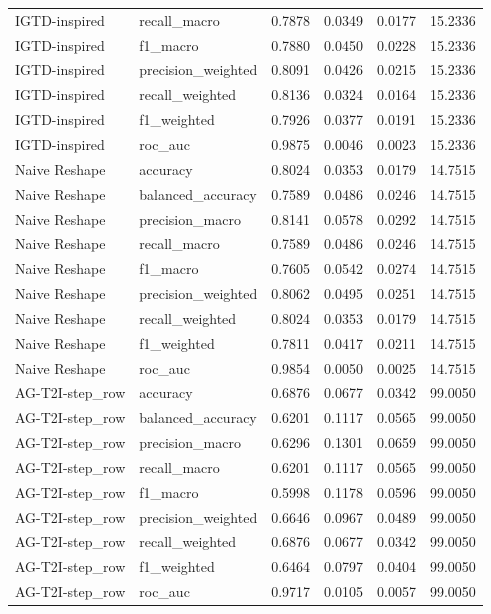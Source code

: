 \begin{tabular}{llrrrr}
IGTD-inspired & recall_macro & 0.7878 & 0.0349 & 0.0177 & 15.2336 \\
IGTD-inspired & f1_macro & 0.7880 & 0.0450 & 0.0228 & 15.2336 \\
IGTD-inspired & precision_weighted & 0.8091 & 0.0426 & 0.0215 & 15.2336 \\
IGTD-inspired & recall_weighted & 0.8136 & 0.0324 & 0.0164 & 15.2336 \\
IGTD-inspired & f1_weighted & 0.7926 & 0.0377 & 0.0191 & 15.2336 \\
IGTD-inspired & roc_auc & 0.9875 & 0.0046 & 0.0023 & 15.2336 \\
Naive Reshape & accuracy & 0.8024 & 0.0353 & 0.0179 & 14.7515 \\
Naive Reshape & balanced_accuracy & 0.7589 & 0.0486 & 0.0246 & 14.7515 \\
Naive Reshape & precision_macro & 0.8141 & 0.0578 & 0.0292 & 14.7515 \\
Naive Reshape & recall_macro & 0.7589 & 0.0486 & 0.0246 & 14.7515 \\
Naive Reshape & f1_macro & 0.7605 & 0.0542 & 0.0274 & 14.7515 \\
Naive Reshape & precision_weighted & 0.8062 & 0.0495 & 0.0251 & 14.7515 \\
Naive Reshape & recall_weighted & 0.8024 & 0.0353 & 0.0179 & 14.7515 \\
Naive Reshape & f1_weighted & 0.7811 & 0.0417 & 0.0211 & 14.7515 \\
Naive Reshape & roc_auc & 0.9854 & 0.0050 & 0.0025 & 14.7515 \\
AG-T2I-step_row & accuracy & 0.6876 & 0.0677 & 0.0342 & 99.0050 \\
AG-T2I-step_row & balanced_accuracy & 0.6201 & 0.1117 & 0.0565 & 99.0050 \\
AG-T2I-step_row & precision_macro & 0.6296 & 0.1301 & 0.0659 & 99.0050 \\
AG-T2I-step_row & recall_macro & 0.6201 & 0.1117 & 0.0565 & 99.0050 \\
AG-T2I-step_row & f1_macro & 0.5998 & 0.1178 & 0.0596 & 99.0050 \\
AG-T2I-step_row & precision_weighted & 0.6646 & 0.0967 & 0.0489 & 99.0050 \\
AG-T2I-step_row & recall_weighted & 0.6876 & 0.0677 & 0.0342 & 99.0050 \\
AG-T2I-step_row & f1_weighted & 0.6464 & 0.0797 & 0.0404 & 99.0050 \\
AG-T2I-step_row & roc_auc & 0.9717 & 0.0105 & 0.0057 & 99.0050 \\

\end{tabular}
